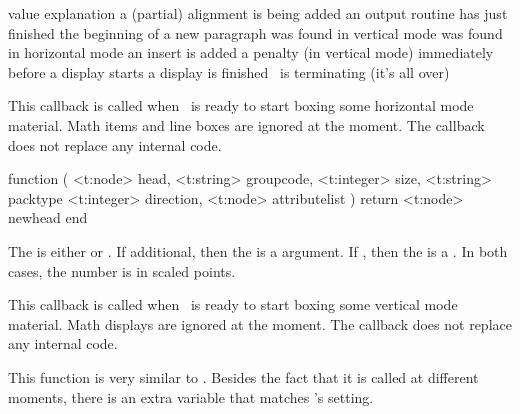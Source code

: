 \starttabulate[|l|p|]
\FL
\BC value                 \BC explanation                                 \NC \NR
\ML
\NC {}      \NC a (partial) alignment is being added        \NC \NR
\NC {}   \NC an output routine has just finished         \NC \NR
\NC {}       \NC the beginning of a new paragraph            \NC \NR
\NC {}      \NC \type {\par} was found in vertical mode     \NC \NR
\NC {}      \NC \type {\par} was found in horizontal mode   \NC \NR
\NC {}         \NC an insert is added                          \NC \NR
\NC {}        \NC a penalty (in vertical mode)                \NC \NR
\NC {} \NC immediately before a display starts         \NC \NR
\NC {}  \NC a display is finished                       \NC \NR
\NC {}            \NC \LUAMETATEX\ is terminating (it's all over) \NC \NR
\LL
\stoptabulate


\stopsubsection

\startsubsection[title=hpack]

This callback is called when \TEX\ is ready to start boxing some horizontal mode
material. Math items and line boxes are ignored at the moment. The callback does
not replace any internal code.

\starttyping[option=LUA]
function (
    <t:node>    head,
    <t:string>  groupcode,
    <t:integer> size,
    <t:string>  packtype
    <t:integer> direction,
    <t:node>    attributelist
)
    return <t:node> newhead
end
\stoptyping

The  is either  or . If \type
{additional}, then the  is a  argument. If
, then the  is a . In both cases,
the number is in scaled points.

\stopsubsection

\startsubsection[title=vpack]

This callback is called when \TEX\ is ready to start boxing some vertical mode
material. Math displays are ignored at the moment. The callback does not replace
any internal code.

This function is very similar to . Besides the fact that it is
called at different moments, there is an extra variable that matches \TEX's \type
{\maxdepth} setting.

